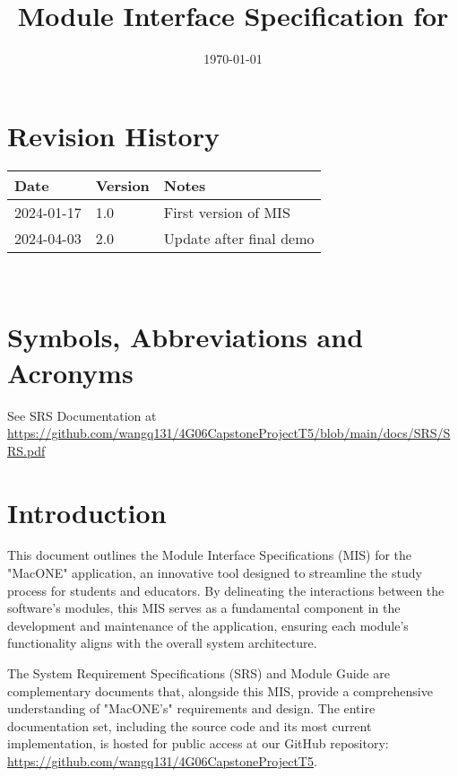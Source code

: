 \documentclass[12pt, titlepage]{article}
\begin{document}
\title{Module Interface Specification for \progname{}}

\author{\authname}

\date{\today}

\maketitle


\section{Revision History}

\begin{tabularx}{\textwidth}{p{3cm}p{2cm}X}
\toprule {\bf Date} & {\bf Version} & {\bf Notes}\\
\midrule
2024-01-17 & 1.0 & First version of MIS\\
2024-04-03 & 2.0 & Update after final demo\\
\bottomrule
\end{tabularx}

~\newpage

\section{Symbols, Abbreviations and Acronyms}

See SRS Documentation at \url{https://github.com/wangq131/4G06CapstoneProjectT5/blob/main/docs/SRS/SRS.pdf}


\newpage

\tableofcontents

\newpage


\section{Introduction}
This document outlines the Module Interface Specifications (MIS) for the "MacONE" application, an innovative tool designed to streamline the study process for students and educators. By delineating the interactions between the software's modules, this MIS serves as a fundamental component in the development and maintenance of the application, ensuring each module's functionality aligns with the overall system architecture.

The System Requirement Specifications (SRS) and Module Guide are complementary documents that, alongside this MIS, provide a comprehensive understanding of "MacONE's" requirements and design. The entire documentation set, including the source code and its most current implementation, is hosted for public access at our GitHub repository: \url{https://github.com/wangq131/4G06CapstoneProjectT5}.
\end{document}
